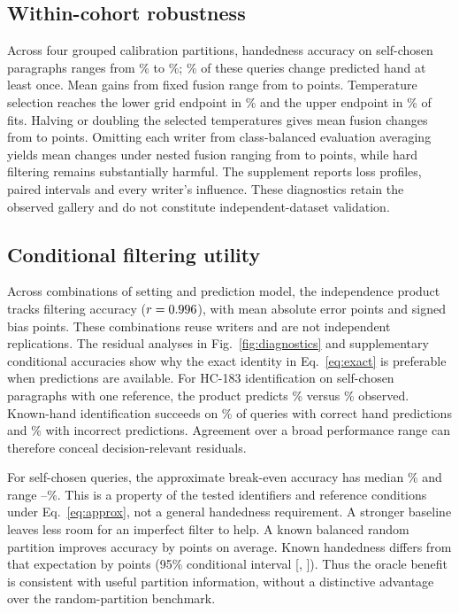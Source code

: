 \documentclass[5p,times,twocolumn,final,numbers,sort&compress]{elsarticle}
\begin{document}
\subsection{Within-cohort robustness}
Across four grouped calibration partitions, handedness accuracy on self-chosen paragraphs ranges from \rSeedAccuracyMin\% to \rSeedAccuracyMax\%; \rSeedDisagree\% of these queries change predicted hand at least once. Mean gains from fixed fusion range from \rSeedGainMin{} to \rSeedGainMax{} points. Temperature selection reaches the lower grid endpoint in \rTempLower\% and the upper endpoint in \rTempUpper\% of fits. Halving or doubling the selected temperatures gives mean fusion changes from \rTempGainMin{} to \rTempGainMax{} points. Omitting each writer from class-balanced evaluation averaging yields mean changes under nested fusion ranging from \rNestedOmitMin{} to \rNestedOmitMax{} points, while hard filtering remains substantially harmful. The supplement reports loss profiles, paired intervals and every writer's influence. These diagnostics retain the observed gallery and do not constitute independent-dataset validation.

\subsection{Conditional filtering utility}
Across \rLawN{} combinations of setting and prediction model, the independence product tracks filtering accuracy ($r=0.996$), with mean absolute error \rLawMae{} points and signed bias \rLawBias{} points. These combinations reuse writers and are not independent replications. The residual analyses in Fig.~\ref{fig:diagnostics} and supplementary conditional accuracies show why the exact identity in Eq.~\eqref{eq:exact} is preferable when predictions are available. For HC-183 identification on self-chosen paragraphs with one reference, the product predicts \rExampleProduct\% versus \rExampleFilter\% observed. Known-hand identification succeeds on \rExampleCondCorrect\% of queries with correct hand predictions and \rExampleCondWrong\% with incorrect predictions. Agreement over a broad performance range can therefore conceal decision-relevant residuals.

For self-chosen queries, the approximate break-even accuracy has median \rThresholdMed\% and range \rThresholdMin--\rThresholdMax\%. This is a property of the tested identifiers and reference conditions under Eq.~\eqref{eq:approx}, not a general handedness requirement. A stronger baseline leaves less room for an imperfect filter to help. A known balanced random partition improves accuracy by \rRandomKnownGain{} points on average. Known handedness differs from that expectation by \rOracleVsRandom{} points (95\% conditional interval [\rOracleVsRandomLo, \rOracleVsRandomHi]). Thus the oracle benefit is consistent with useful partition information, without a distinctive advantage over the random-partition benchmark.
\end{document}
